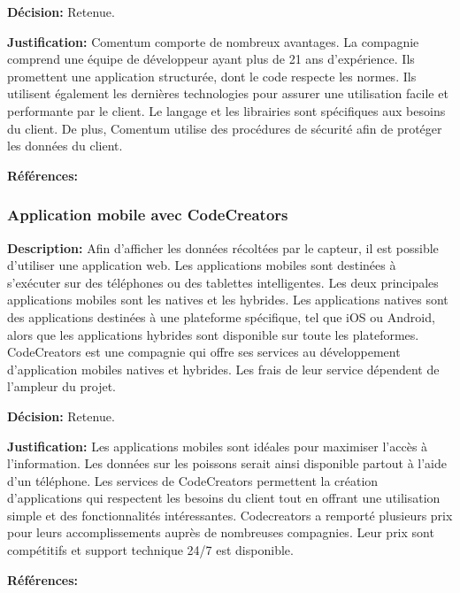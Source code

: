 \textbf{Décision:} Retenue.

\textbf{Justification:} Comentum comporte de nombreux avantages. La compagnie comprend une équipe de développeur ayant plus de 21 ans d'expérience. Ils promettent une application structurée, dont le code respecte les normes. Ils utilisent également les dernières technologies pour assurer une utilisation facile et performante par le client. Le langage et les librairies sont spécifiques aux besoins du client. De plus, Comentum utilise des procédures de sécurité afin de protéger les données du client.

\textbf{Références:} \cite{Comentum}

\subsubsection{Application mobile avec CodeCreators}

\textbf{Description:} Afin d'afficher les données récoltées par le capteur, il est possible d'utiliser une application web. Les applications mobiles sont destinées à s'exécuter sur des téléphones ou des tablettes intelligentes. Les deux principales applications mobiles sont les natives et les hybrides. Les applications natives sont des applications destinées à une plateforme spécifique, tel que iOS ou Android, alors que les applications hybrides sont disponible sur toute les plateformes. CodeCreators est une compagnie qui offre ses services au développement d'application mobiles natives et hybrides. Les frais de leur service dépendent de l'ampleur du projet.

\textbf{Décision:} Retenue.

\textbf{Justification:} Les applications mobiles sont idéales pour maximiser l'accès à l'information. Les données sur les poissons serait ainsi disponible partout à l'aide d'un téléphone. Les services de CodeCreators permettent la création d'applications qui respectent les besoins du client tout en offrant une utilisation simple et des fonctionnalités intéressantes. Codecreators a remporté plusieurs prix pour leurs accomplissements auprès de nombreuses compagnies. Leur prix sont compétitifs et support technique 24/7 est disponible.

\textbf{Références:} \cite{CodeCreators} \cite{CodeCreators2}

